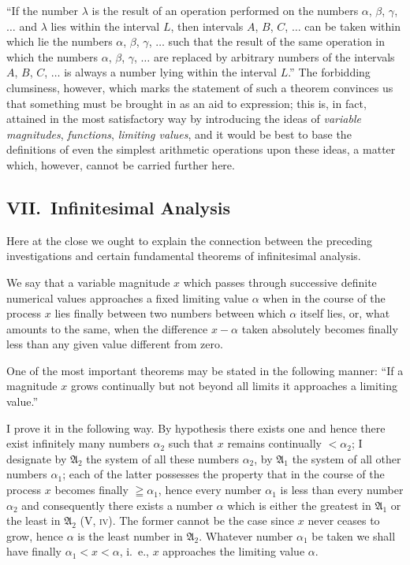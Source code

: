\documentclass[twoside,openright]{article}
\begin{document}
``If the number $\lambda$ is the result of an operation performed on
the numbers $\alpha$, $\beta$, $\gamma$, $\ldots$ and $\lambda$ lies
within the interval $L$, then intervals $A$, $B$, $C$, $\ldots$ can be
taken within which lie the numbers $\alpha$, $\beta$, $\gamma$,
$\ldots$ such that the result of the same operation in which the
numbers $\alpha$, $\beta$, $\gamma$, $\ldots$ are replaced by
arbitrary numbers of the intervals $A$, $B$, $C$, $\ldots$ is always a
number lying within the interval $L$.'' The forbidding clumsiness,
however, which marks the statement of such a theorem convinces us that
something must be brought in as an aid to expression; this is, in
fact, attained in the most satisfactory way by introducing the ideas
of \textit{variable magnitudes}, \textit{functions}, \textit{limiting
  values}, and it would be best to base the definitions of even the
simplest arithmetic operations upon these ideas, a matter which,
however, cannot be carried further here.

\subsection*{VII.\ Infinitesimal Analysis}

Here at the close we ought to explain the connection between the
preceding investigations and certain fundamental theorems of
infinitesimal analysis.

We say that a variable magnitude $x$ which passes through successive
definite numerical values approaches a fixed limiting value $\alpha$
when in the course of the process $x$ lies finally between two numbers
between which $\alpha$ itself lies, or, what amounts to the same, when
the difference $x-\alpha$ taken absolutely becomes finally less than
any given value different from zero.

One of the most important theorems may be stated in the following
manner: ``If a magnitude $x$ grows continually but not beyond all
limits it approaches a limiting value.''

I prove it in the following way. By hypothesis there exists one and
hence there exist infinitely many numbers $\alpha_2$ such that $x$
remains continually $<\alpha_2$; I designate by $\mathfrak{A}_2$ the
system of all these numbers $\alpha_2$, by $\mathfrak{A}_1$ the system
of all other numbers $\alpha_1$; each of the latter possesses the
property that in the course of the process $x$ becomes finally
$\geqq \alpha_1$, hence every number $\alpha_1$ is less than every
number $\alpha_2$ and consequently there exists a number $\alpha$
which is either the greatest in $\mathfrak{A}_1$ or the least in
$\mathfrak{A}_2$ (V, \textsc{iv}). The former cannot be the case since
$x$ never ceases to grow, hence $\alpha$ is the least number in
$\mathfrak{A}_2$. Whatever number $\alpha_1$ be taken we shall have
finally $\alpha_1<x<\alpha$, i.~e., $x$ approaches the limiting value
$\alpha$.
\end{document}
